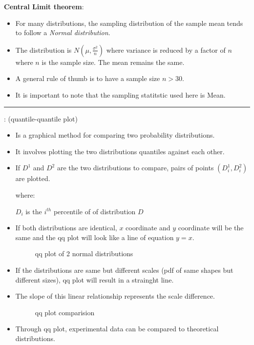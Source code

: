 \documentclass[	DIV=calc,%
paper=a4,%
fontsize=11pt,%
twocolumn]{scrartcl} %
\newcommand{\hformbar}[1]{\vspace{5pt}\hrule\vspace{10pt}} %
\newcommand{\formdesc}[1]{\noindent\textbf{#1}}
\begin{document}
\formdesc{Central Limit theorem}:
\begin{itemize}
	\item For many distributions, the sampling distribution of the sample mean tends to follow a \emph{Normal distribution}.
	\item The distribution is $N (\mu,\frac{\sigma^2}{n})$ where variance is reduced by a factor of $n$ where $n$ is the sample size. The mean remains the same.
	\item A general rule of thumb is to have a sample size $n > 30$.
	\item It is important to note that the sampling statitstic used here is Mean.
\end{itemize}

\hformbar

\formdesc{Q-Q Plot}: (quantile-quantile  plot)
\begin{itemize}
	\item Is a graphical method for comparing two probability distributions.
	\item It involves plotting the two distributions quantiles against each other.
	\item If $D^1$ and $D^2$ are the two distributions to compare, pairs of points $(D_i^ 1,D_i^ 2)$ are plotted.
	
		where:
		
			$D_i$ is the $i^{th}$ percentile of of distribution $D$
	\item If both distributions are identical, $x$ coordinate and $y$ coordinate will be the same and the qq plot will look like a line of equation $y=x$.
	
	\begin{figure}[ht!]
		\centering
		\caption{qq plot of 2 normal distributions}
		\graphicspath{ {images/math/} }
		
	\end{figure}

	\item If the distributions are same but different scales (pdf of same shapes but different sizes), qq plot will result in a strainght line.
	\item The slope of this linear relationship represents the scale difference.
		\begin{figure}[ht!]
		\centering
		\caption{qq plot comparision}
		\graphicspath{ {images/math/} }
		
	\end{figure}

	\item Through qq plot, experimental data can be compared to theoretical distributions.
\end{itemize}
\end{document}
